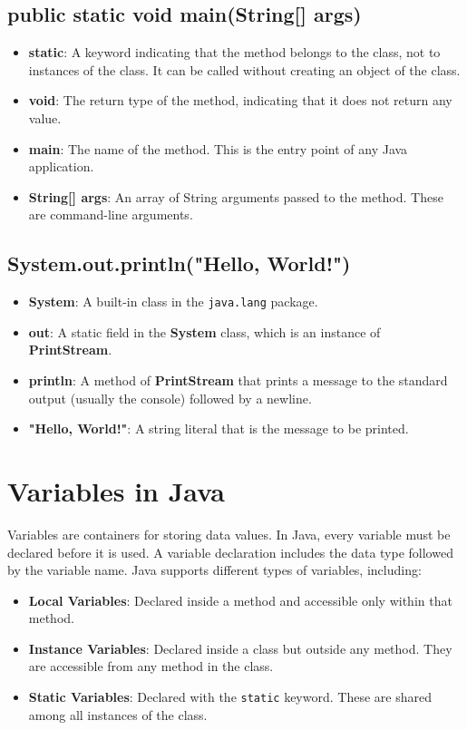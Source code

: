 \documentclass[a4paper,12pt]{article}
\begin{document}
\subsection*{public static void main(String[] args)}
\begin{itemize}[leftmargin=2cm]
    \item \textbf{static}: A keyword indicating that the method belongs to the class, not to instances of the class. It can be called without creating an object of the class.
    \item \textbf{void}:  The return type of the method, indicating that it does not return any value.
    \item \textbf{main}: The name of the method. This is the entry point of any Java application.
    \item \textbf{String[] args}: An array of String arguments passed to the method. These are command-line arguments.
\end{itemize}

\subsection*{System.out.println("Hello, World!")}
\begin{itemize}[leftmargin=2cm]
    \item \textbf{System}: A built-in class in the \texttt{java.lang} package.
    \item \textbf{out}: A static field in the \textbf{System} class, which is an instance of \textbf{PrintStream}.
    \item \textbf{println}: A method of \textbf{PrintStream} that prints a message to the standard output (usually the console) followed by a newline.
    \item \textbf{"Hello, World!"}: A string literal that is the message to be printed.
\end{itemize}


\section{Variables in Java}
Variables are containers for storing data values. In Java, every variable must be declared before it is used. A variable declaration includes the data type followed by the variable name. Java supports different types of variables, including:
\begin{itemize}[leftmargin=2cm]
    \item \textbf{Local Variables}: Declared inside a method and accessible only within that method.
    \item \textbf{Instance Variables}: Declared inside a class but outside any method. They are accessible from any method in the class.
    \item \textbf{Static Variables}: Declared with the \texttt{static} keyword. These are shared among all instances of the class.
\end{itemize}
\end{document}
